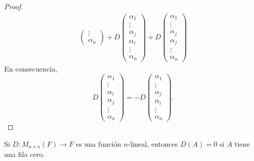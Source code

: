\documentclass[12pt,a4paper]{book}
\begin{document}
\begin{proof}
\begin{align*}
\begin{pmatrix}
                \vdots\\
                \alpha_n
            \end{pmatrix} + D
            \begin{pmatrix}
                \alpha_1\\
                \vdots\\
                \alpha_j\\
                \alpha_{i}\\
                \vdots\\
                \alpha_n
            \end{pmatrix} + D
            \begin{pmatrix}
                \alpha_1\\
                \vdots\\
                \alpha_j\\
                \alpha_{j}\\
                \vdots\\
                \alpha_n
            \end{pmatrix}
        \end{align*}
        En consecuencia,
        \[
            D\begin{pmatrix}
            \alpha_1\\
            \vdots\\
            \alpha_i\\
            \alpha_j\\
            \vdots\\
            \alpha_n
        \end{pmatrix} = -D
        \begin{pmatrix}
            \alpha_1\\
            \vdots\\
            \alpha_j\\
            \alpha_i\\
            \vdots\\
            \alpha_n
        \end{pmatrix}.
        \]
    \end{proof}

    \begin{lema}
        Si $D:M_{n \times n}(F) \to F$ es una función $n$-lineal, entonces $D(A) = 0$ si $A$ tiene una fila cero.
    \end{lema}
    
\end{document}
